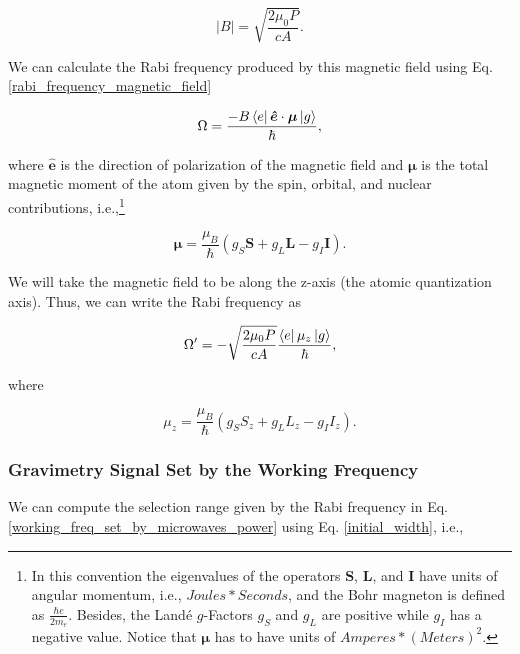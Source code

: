 \documentclass{article}
\begin{document}
\begin{equation}
    |B| = \sqrt{\frac{2 \mu_{0} P}{c A}}.
\end{equation}

We can calculate the Rabi frequency produced by this magnetic field using Eq. \ref{rabi_frequency_magnetic_field}

\begin{equation*}
\Omega = \frac{- B \bra{e} \boldsymbol{\hat{e}} \cdot \boldsymbol{\mu} \ket{g}}{\hbar},
\end{equation*}

where $\boldsymbol{\hat{e}}$ is the direction of polarization of the magnetic field and $\boldsymbol{\mu}$ is the total magnetic moment of the atom given by the spin, orbital, and nuclear contributions, i.e.,\footnote{In this convention the eigenvalues of the operators $\boldsymbol{S}$, $\boldsymbol{L}$, and $\boldsymbol{I}$ have units of angular momentum, i.e., $Joules*Seconds$, and the Bohr magneton is defined as $\frac{\hbar e}{2 m_{e}}$. Besides, the Landé $g$-Factors $g_{S}$ and $g_{L}$ are positive while $g_{I}$ has a negative value. Notice that $\boldsymbol{\mu}$ has to have units of $Amperes*(Meters)^2$.}

\begin{equation}
     \boldsymbol{\mu} = \frac{\mu_{B}}{\hbar}(g_{S}\boldsymbol{S} + g_{L}\boldsymbol{L} - g_{I}\boldsymbol{I}).
\end{equation}

We will take the magnetic field to be along the z-axis (the atomic quantization axis). Thus, we can write the Rabi frequency as

\begin{equation}\label{working_freq_set_by_microwaves_power}
\Omega' = - \sqrt{\frac{2 \mu_{0} P}{c A}} \frac{\bra{e} \mu_{z} \ket{g}}{\hbar},
\end{equation}

where 

\begin{equation}
     \mu_{z} = \frac{\mu_{B}}{\hbar}(g_{S}S_{z} + g_{L}L_{z} - g_{I}I_{z}).
\end{equation}

\subsubsection{Gravimetry Signal Set by the Working Frequency}
We can compute the selection range given by the Rabi frequency in Eq. \ref{working_freq_set_by_microwaves_power} using Eq. \ref{initial_width}, i.e.,
\end{document}
